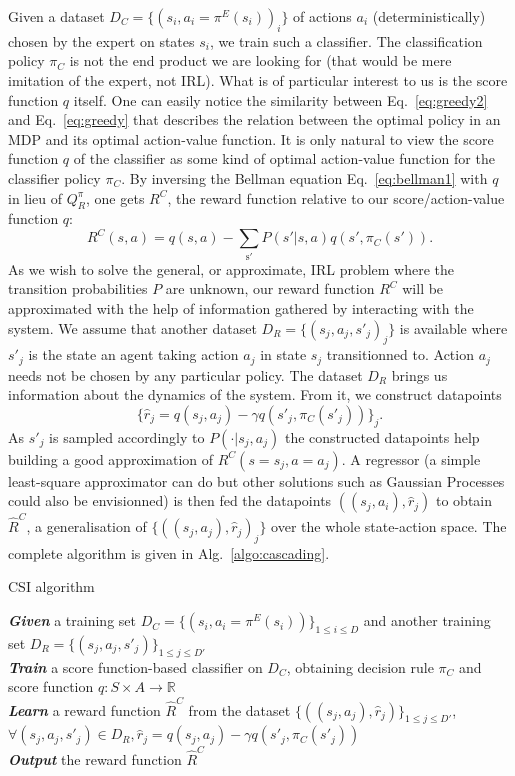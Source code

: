 \documentclass[smallextended]{svjour3}
\begin{document}
Given a dataset $D_C = \{(s_i,a_i=\pi^E(s_i))_i\}$ of actions $a_i$ (deterministically) chosen by the expert on states $s_i$, we train such a classifier. The classification policy $\pi_C$ is not the end product we are looking for (that would be mere imitation of the expert, not IRL). What is of particular interest to us is the score function $q$ itself. One can easily notice the similarity between Eq.~\ref{eq:greedy2} and Eq.~\ref{eq:greedy} that describes the relation between the optimal policy in an MDP and its optimal action-value function. It is only natural to view the score function $q$ of the classifier as some kind of optimal action-value function for the classifier policy $\pi_C$. By inversing the Bellman equation Eq.~\ref{eq:bellman1} with $q$ in lieu of $Q^\pi_R$, one gets $R^C$, the reward function relative to our score/action-value function $q$:
\begin{equation}
  \label{eq:rc}
  R^C(s,a) =q(s,a) - \sum_{\mathrm{s'}}P(s'|s,a)q(s',\pi_C(s')).
\end{equation}
As we wish to solve the general, or approximate, IRL problem where the transition probabilities $P$ are unknown, our reward function $R^C$ will be approximated with the help of information gathered by interacting with the system. We assume that another dataset $D_R = \{(s_j,a_j,s'_j)_j\}$ is available where $s'_j$ is the state an agent taking action $a_j$ in state $s_j$ transitionned to. Action $a_j$ needs not be chosen by any particular policy. The dataset $D_R$ brings us information about the dynamics of the system. From it, we construct datapoints
\begin{equation}
  \label{eq:rj}
  \{\hat r_j = q(s_j,a_j) - \gamma q(s'_j,\pi_C(s'_j))\}_j.
\end{equation}
As $s'_j$ is sampled accordingly to $P(\cdot|s_j,a_j)$ the constructed datapoints help building a good approximation of $R^C(s=s_j,a=a_j)$. A regressor (a simple least-square approximator can do but other solutions such as Gaussian Processes \cite{rasmussen2006gaussian} could also be envisionned) is then fed the datapoints $((s_j,a_i),\hat r_j)$ to obtain $\hat R^C$, a generalisation of $\{((s_j,a_j),\hat r_j)_j\}$ over the whole state-action space. The complete algorithm is given in Alg.~\ref{algo:cascading}.
\begin{algorithm}%
  \caption{CSI algorithm}
  \label{algo:cascading}
  \emph{\textbf{Given}} a training set $D_C=\{(s_i,a_i=\pi^E(s_i))\}_{1\leq i \leq D}$ and another training set $D_R=\{(s_{j},a_{j},s'_{j})\}_{1\leq j \leq D'}$\;\\
  \emph{\textbf{Train}} a score function-based classifier on $D_C$, obtaining decision rule $\pi_C$ and score function $q:S\times A \rightarrow \mathbb R$\;\\
  \emph{\textbf{Learn}} a reward function $\hat R^C$ from the dataset $\{((s_{j},a_{j}),\hat{r}_j)\}_{1\leq j \leq D'}$, $\forall (s_j,a_j,s'_j) \in D_R,\hat{r}_j=q(s_{j},a_{j})-\gamma q(s'_{j},\pi_C(s'_{j}))$\;\\
  \emph{\textbf{Output}} the reward function $\hat R^{C}$ \;
\end{algorithm}
\end{document}
